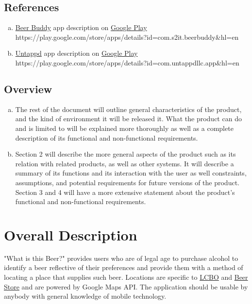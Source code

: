 \documentclass[]{article}
\begin{document}
\subsection{{References}}
\label{sub:references}
\begin{enumerate}[a)]
	\item \underline{Beer Buddy} app description on \underline{Google Play}  \\
https://play.google.com/store/apps/details?id=com.s2it.beerbuddy\&hl=en
	\item \underline{Untappd} app description on \underline{Google Play} \\
https://play.google.com/store/apps/details?id=com.untappdllc.app\&hl=en
	\\
	
\end{enumerate}

\subsection{{Overview}}
\label{sub:overview}
\begin{enumerate}[a)]
	\item  The rest of the document will outline general characteristics of the product, and the kind of environment it will be released it. What the product can do and is limited to will be explained more thoroughly as well as a complete description of its functional and non-functional requirements.
	\item Section 2 will describe the more general aspects of the product such as its relation with related products, as well as other systems. It will describe a summary of its functions and its interaction with the user as well constraints, assumptions, and potential requirements for future versions of the product. Section 3 and 4 will have a more extensive statement about the product's functional and non-functional requirements.
\end{enumerate}


\section{Overall Description}
\label{sec:overall_description}

"What is this Beer?" provides users who are of legal age to purchase alcohol to identify a beer reflective of their preferences and provide them with a method of locating a place that supplies such beer. Locations are specific to \underline{LCBO} and \underline{Beer Store} and are powered by Google Maps API. The application should be usable by anybody with general knowledge of mobile technology. \\
\end{document}
